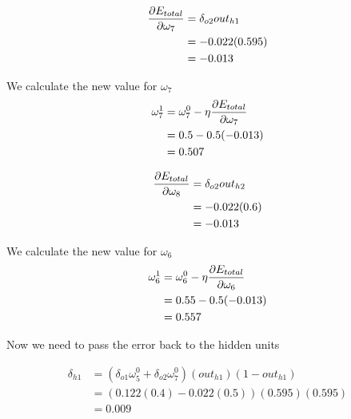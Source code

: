 \documentclass[10pt,a4paper]{article}
\begin{document}
\begin{equation}
\begin{split}
\pdv{E_{total}}{\omega_7} &= \delta_{o2}out_{h1}\\
                          &= -0.022(0.595)\\
                          &= -0.013\\
\end{split}
\end{equation}

We calculate the new value for $\omega_7$
\begin{equation}
\begin{split}
\omega_7^1 &= \omega_7^0 - \eta\pdv{E_{total}}{\omega_7}\\
           &= 0.5 -0.5(-0.013)\\
           &= 0.507\\
\end{split}
\end{equation}

\begin{equation}
\begin{split}
\pdv{E_{total}}{\omega_8} &= \delta_{o2}out_{h2}\\
                          &= -0.022(0.6)\\
                          &= -0.013\\
\end{split}
\end{equation}

We calculate the new value for $\omega_6$
\begin{equation}
\begin{split}
\omega_6^1 &= \omega_6^0 - \eta\pdv{E_{total}}{\omega_6}\\
           &= 0.55 -0.5(-0.013)\\
           &= 0.557\\
\end{split}
\end{equation}







Now we need to pass the error back to the hidden units

\begin{equation}
\begin{split}
\delta_{h1} &= (\delta_{o1}\omega_5^0 + \delta_{o2}\omega_7^0)(out_{h1})(1-out_{h1})\\
&= (0.122(0.4) -0.022(0.5))(0.595)(0.595)\\
&= 0.009\\
\end{split}
\end{equation}
\end{document}
